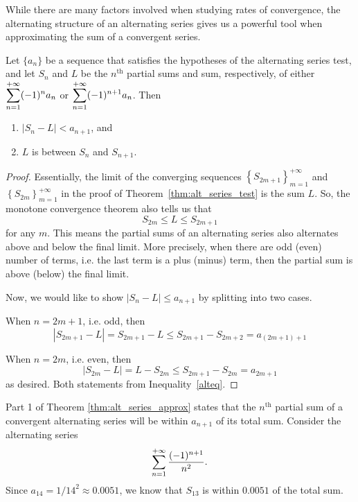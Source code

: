 While there are many factors involved when studying rates of convergence, the alternating structure of an alternating series gives us a powerful tool when approximating the sum of a convergent series. 

\begin{theorem}\label{thm:alt_series_approx}
Let $\{a_n\}$ be a sequence that satisfies the hypotheses of the alternating series test, and let $S_n$ and $L$ be the $n^\text{th}$ partial sums and sum, respectively, of either $\displaystyle \sum_{n=1}^{+\infty} (-1)^{n}a_n$ or $\displaystyle \sum_{n=1}^{+\infty} (-1)^{n+1}a_n$. Then
\begin{enumerate}
	\item $|S_n-L| < a_{n+1}$, and
	\item	$L$ is between $S_n$ and $S_{n+1}$.
\end{enumerate}
\end{theorem}

\ifanalysis

\begin{proof}
Essentially, the limit of the converging sequences $\left\{S_{2m+1}\right\}_{m=1}^{+\infty}$ and $\left\{S_{2m}\right\}_{m=1}^{+\infty}$  in the proof of Theorem~\ref{thm:alt_series_test} is the sum $L$. So, the monotone convergence theorem also tells us that
\begin{equation}
\displaystyle S_{2m}\leq L\leq S_{2m+1}
\label{alteq}
\end{equation}
for any $m$. This means the partial sums of an alternating series also alternates above and below the final limit. More precisely, when there are odd (even) number of terms, i.e. the last term is a plus (minus) term, then the partial sum is above (below) the final limit. 

Now, we would like to show $\displaystyle \left|S_{n}-L\right|\leq a_{n+1}$ by splitting into two cases.

When $n = 2m+1$, i.e. odd, then 
$$
\displaystyle \left|S_{2m+1}-L\right|=S_{2m+1}-L\leq S_{2m+1}-S_{2m+2}=a_{(2m+1)+1}
$$

When $n = 2m$, i.e. even, then
$$
\displaystyle \left|S_{2m}-L\right|=L-S_{2m}\leq S_{2m+1}-S_{2m}=a_{2m+1}
$$
as desired. Both statements from Inequality~\eqref{alteq}. 
\end{proof}

\fi

Part 1 of Theorem \ref{thm:alt_series_approx} states that the $n^\text{th}$ partial sum of a convergent alternating series will be within $a_{n+1}$ of its total sum. Consider the alternating series 
$$\displaystyle \sum_{n=1}^{+\infty} \frac{(-1)^{n+1}}{n^2}.$$
 Since $a_{14} = 1/14^2 \approx 0.0051$, we know that $S_{13}$ is within $0.0051$ of the total sum. %

